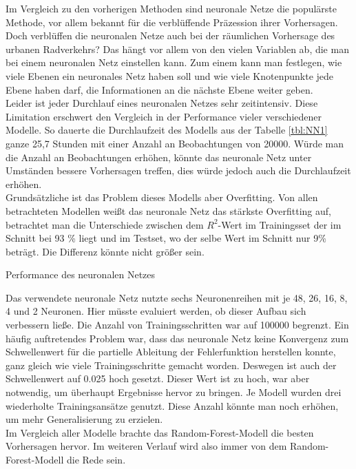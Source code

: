 \documentclass[a4paper,12pt]{thesis}
\begin{document}
Im Vergleich zu den vorherigen Methoden sind neuronale Netze die populärste Methode, vor allem bekannt für die verblüffende Präzession ihrer Vorhersagen. Doch verblüffen die neuronalen Netze auch bei der räumlichen Vorhersage des urbanen Radverkehrs? Das hängt vor allem von den vielen Variablen ab, die man bei einem neuronalen Netz einstellen kann. Zum einem kann man festlegen, wie viele Ebenen ein neuronales Netz haben soll und wie viele Knotenpunkte jede Ebene haben darf, die Informationen an die nächste Ebene weiter geben.\\
Leider ist jeder Durchlauf eines neuronalen Netzes sehr zeitintensiv. Diese Limitation erschwert den Vergleich in der Performance vieler verschiedener Modelle. So dauerte die Durchlaufzeit des Modells aus der Tabelle \ref{tbl:NN1} ganze 25,7 Stunden mit einer Anzahl an Beobachtungen von 20000. Würde man die Anzahl an Beobachtungen erhöhen, könnte das neuronale Netz unter Umständen bessere Vorhersagen treffen, dies würde jedoch auch die Durchlaufzeit erhöhen.\\
Grundsätzliche ist das Problem dieses Modells aber Overfitting. Von allen betrachteten Modellen weißt das neuronale Netz das stärkste Overfitting auf, betrachtet man die Unterschiede zwischen dem $R^2$-Wert im Trainingsset der im Schnitt bei 93 \% liegt und im Testset, wo der selbe Wert im Schnitt nur 9\% beträgt. Die Differenz könnte nicht größer sein.

\begin{table}
	\caption{Performance des neuronalen Netzes}
	\label{tbl:NN1}
\end{table}

Das verwendete neuronale Netz nutzte sechs Neuronenreihen mit je 48, 26, 16, 8, 4 und 2 Neuronen. Hier müsste evaluiert werden, ob dieser Aufbau sich verbessern ließe. Die Anzahl von Trainingsschritten war auf 100000 begrenzt. Ein häufig auftretendes Problem war, dass das neuronale Netz keine Konvergenz zum Schwellenwert für die partielle Ableitung der Fehlerfunktion herstellen konnte, ganz gleich wie viele Trainingsschritte gemacht worden. Deswegen ist auch der Schwellenwert auf 0.025 hoch gesetzt. Dieser Wert ist zu hoch, war aber notwendig, um überhaupt Ergebnisse hervor zu bringen. Je Modell wurden drei wiederholte Trainingsansätze genutzt. Diese Anzahl könnte man noch erhöhen, um mehr Generalisierung zu erzielen.\\
Im Vergleich aller Modelle brachte das Random-Forest-Modell die besten Vorhersagen hervor. Im weiteren Verlauf wird also immer von dem Random-Forest-Modell die Rede sein.
\end{document}
